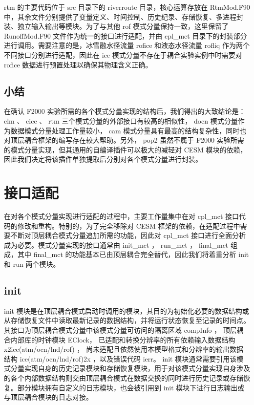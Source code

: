 rtm 的主要代码位于 src 目录下的 riverroute 目录，核心运算存放在 RtmMod.F90 中，其余文件分别提供了变量定义、时间控制、历史纪录、存储恢复、多进程封装、独立输入输出等模块。为了与其他 rof 模式分量保持一致，这里保留了 RunoffMod.F90 文件作为统一的接口进行适配，并由 cpl\_mct 目录下的封装部分进行调用。需要注意的是，冰雪融水径流量 rofice 和液态水径流量 rofliq 作为两个不同接口分别进行适配，因此在 ice 模式分量不存在于耦合实验实例中时需要对 rofice 数据进行预置处理以确保其物理含义正确。

\subsection{小结}

在确认 F2000 实验所需的各个模式分量实现的结构后，我们得出的大致结论是： clm 、 cice 、 rtm 三个模式分量的外部接口有较高的相似性， docn 模式分量作为数据模式分量处理工作量较小， cam 模式分量具有最高的结构复杂性，同时也对顶层耦合框架的编写存在较大帮助。另外， pop2 虽然不属于 F2000 实验所需的模式分量实现，但其通用的自编译插件可以极大的减轻对 CESM 模块的依赖，因此我们决定将该插件单独提取后分别对各个模式分量进行封装。

\section{接口适配}

在对各个模式分量实现进行适配的过程中，主要工作量集中在对 cpl\_mct 接口代码的修改和重构。特别的，为了完全移除对 CESM 框架的依赖，在适配过程中需要不断对顶层耦合模式分量追加所需的功能，因此对 cpl\_mct 接口进行全面分析成为必要。模式分量实现的接口通常由 init\_mct ， run\_mct ， final\_mct 组成，其中 final\_mct 的功能基本已由顶层耦合完全替代，因此我们将着重分析 init 和 run 两个模块。

\subsection{init}

init 模块是在顶层耦合模式启动时调用的模块，其目的为初始化必要的数据结构或从存储恢复文件中读取最新记录的数据结构，并将运行状态恢复至记录的时间点。其接口为顶层耦合模式分量中该模式分量可访问的隔离区域 compInfo ， 顶层耦合内部库的时钟模块 EClock， 已适配和转换分辨率的所有依赖输入数据结构 x2ice(atm/ocn/lnd/rof) ， 尚未适配且依然使用本模型格式和分辨率的输出数据结构 ice(atm/ocn/lnd/rof)2x ，以及错误代码 ierr。 init 模块通常需要引用该模式分量实现自身的历史记录模块和存储恢复模块，用于对该模式分量实现自身涉及的各个内部数据结构则交由顶层耦合模式在数据交换的同时进行历史记录或存储恢复。部分模块拥有自定义的日志模块，也会被引用到 init 模块下进行日志输出或与顶层耦合模块的日志对接。

